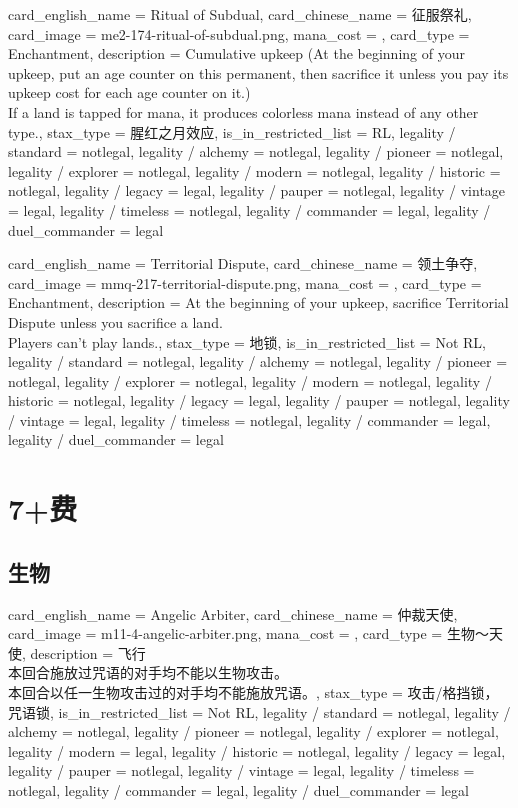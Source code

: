 \documentclass[lang = cn, color = black, 10pt]{AllThatStax}
\begin{document}
\card
{
	card_english_name = {Ritual of Subdual},
	card_chinese_name = {征服祭礼},
	card_image = me2-174-ritual-of-subdual.png,
	mana_cost = ,
	card_type = Enchantment,
	description = {Cumulative upkeep  (At the beginning of your upkeep, put an age counter on this permanent, then sacrifice it unless you pay its upkeep cost for each age counter on it.)\\
		If a land is tapped for mana, it produces colorless mana instead of any other type.},
	stax_type = 腥红之月效应,
	is_in_restricted_list = RL,
	legality / standard = notlegal,
	legality / alchemy = notlegal,
	legality / pioneer = notlegal,
	legality / explorer = notlegal,
	legality / modern = notlegal,
	legality / historic = notlegal,
	legality / legacy = legal,
	legality / pauper = notlegal,
	legality / vintage = legal,
	legality / timeless = notlegal,
	legality / commander = legal,
	legality / duel_commander = legal
}

\card
{
	card_english_name = {Territorial Dispute},
	card_chinese_name = {领土争夺},
	card_image = mmq-217-territorial-dispute.png,
	mana_cost = ,
	card_type = Enchantment,
	description = {At the beginning of your upkeep, sacrifice Territorial Dispute unless you sacrifice a land.\\
		Players can't play lands.},
	stax_type = 地锁,
	is_in_restricted_list = Not RL,
	legality / standard = notlegal,
	legality / alchemy = notlegal,
	legality / pioneer = notlegal,
	legality / explorer = notlegal,
	legality / modern = notlegal,
	legality / historic = notlegal,
	legality / legacy = legal,
	legality / pauper = notlegal,
	legality / vintage = legal,
	legality / timeless = notlegal,
	legality / commander = legal,
	legality / duel_commander = legal
}

\chapter{7+费}

\section{生物}

\card
{
	card_english_name = {Angelic Arbiter},
	card_chinese_name = {仲裁天使},
	card_image = m11-4-angelic-arbiter.png,
	mana_cost = ,
	card_type = 生物～天使,
	description = {飞行\\
		本回合施放过咒语的对手均不能以生物攻击。\\
		本回合以任一生物攻击过的对手均不能施放咒语。},
	stax_type = 攻击/格挡锁，咒语锁,
	is_in_restricted_list = Not RL,
	legality / standard = notlegal,
	legality / alchemy = notlegal,
	legality / pioneer = notlegal,
	legality / explorer = notlegal,
	legality / modern = legal,
	legality / historic = notlegal,
	legality / legacy = legal,
	legality / pauper = notlegal,
	legality / vintage = legal,
	legality / timeless = notlegal,
	legality / commander = legal,
	legality / duel_commander = legal
}
\end{document}
